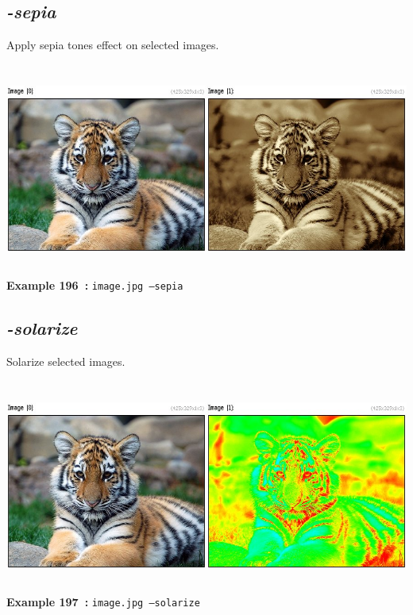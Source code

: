 \documentclass[a4paper,11pt,twoside]{book}
\begin{document}
\subsection{\emph{-sepia} }\vspace*{-0.5em}
Apply sepia tones effect on selected images.
\begin{center}\includegraphics[keepaspectratio=true,height=7cm,width=\textwidth]{img/gmic_def196.jpg}\\
{\footnotesize \textbf{Example 196~:} \texttt{image.jpg --sepia}}
\end{center}

\subsection{\emph{-solarize} }\vspace*{-0.5em}
Solarize selected images.
\begin{center}\includegraphics[keepaspectratio=true,height=7cm,width=\textwidth]{img/gmic_def197.jpg}\\
{\footnotesize \textbf{Example 197~:} \texttt{image.jpg --solarize}}
\end{center}
\end{document}
